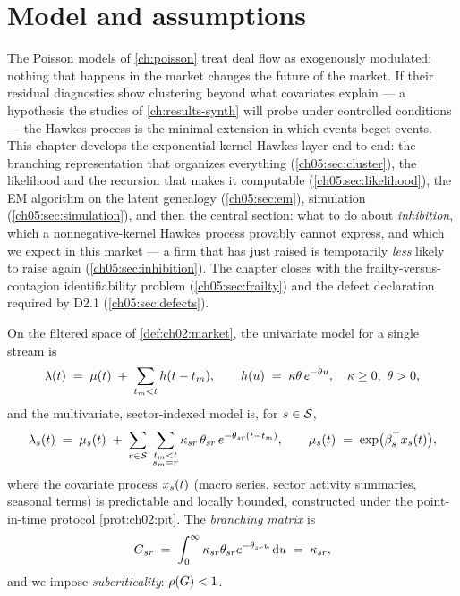 
\section{Model and assumptions}\label{ch05:sec:model}

The Poisson models of \cref{ch:poisson} treat deal flow as exogenously
modulated: nothing that happens in the market changes the future of the
market. If their residual diagnostics show clustering beyond what
covariates explain --- a hypothesis the studies of \cref{ch:results-synth}
will probe under controlled conditions --- the Hawkes process
\citep{hawkes1971} is the
minimal extension in which events beget events. This chapter develops the
exponential-kernel Hawkes layer end to end: the branching representation
that organizes everything (\cref{ch05:sec:cluster}), the likelihood and the
recursion that makes it computable (\cref{ch05:sec:likelihood}), the EM
algorithm on the latent genealogy (\cref{ch05:sec:em}), simulation
(\cref{ch05:sec:simulation}), and then the central section:
what to do about \emph{inhibition}, which a nonnegative-kernel Hawkes
process provably cannot express, and which we expect in this market --- a
firm that has just raised is temporarily \emph{less} likely to raise again
(\cref{ch05:sec:inhibition}). The chapter closes with the
frailty-versus-contagion identifiability problem
(\cref{ch05:sec:frailty}) and the defect declaration required by D2.1
(\cref{ch05:sec:defects}).

\begin{assumption}\label{asm:ch05:model}
On the filtered space of \cref{def:ch02:market}, the univariate model for a
single stream is
\begin{equation}\label{eq:ch05:uni}
\lambda(t) \;=\; \mu(t) \;+\; \sum_{t_m < t} h(t - t_m),
\qquad
h(u) \;=\; \kappa\theta\, e^{-\theta u},
\quad \kappa \ge 0,\ \theta > 0,
\end{equation}
and the multivariate, sector-indexed model is, for $s \in \mathcal{S}$,
\begin{equation}\label{eq:ch05:multi}
\lambda_s(t) \;=\; \mu_s(t) \;+\; \sum_{r \in \mathcal{S}}\;
\sum_{\substack{t_m < t \\ s_m = r}}
\kappa_{sr}\,\theta_{sr}\, e^{-\theta_{sr}(t - t_m)},
\qquad
\mu_s(t) \;=\; \exp\!\big(\beta_s^{\top} x_s(t)\big),
\end{equation}
where the covariate process $x_s(t)$ (macro series, sector activity
summaries, seasonal terms) is predictable and locally bounded, constructed
under the point-in-time protocol \cref{prot:ch02:pit}. The
\emph{branching matrix} is
\begin{equation}\label{eq:ch05:gmat}
G_{sr} \;=\; \int_0^{\infty} \kappa_{sr}\theta_{sr} e^{-\theta_{sr}u}
\,\mathrm{d} u \;=\; \kappa_{sr},
\end{equation}
and we impose \emph{subcriticality}: $\rho\!\left(G\right) < 1$.
\end{assumption}

